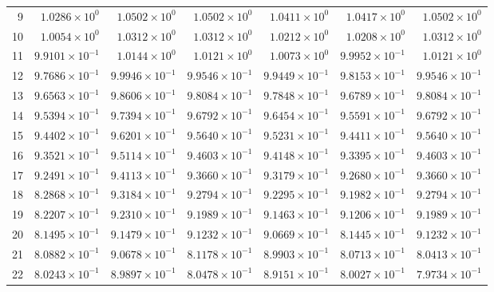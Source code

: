 \begin{table}[H]
\begin{tabular}{@{}rrrrrrr@{}}
9 & $1.0286\times10^{0}$ & $1.0502\times10^{0}$ & $1.0502\times10^{0}$ & $1.0411\times10^{0}$ & $1.0417\times10^{0}$ & $1.0502\times10^{0}$\\
10 & $1.0054\times10^{0}$ & $1.0312\times10^{0}$ & $1.0312\times10^{0}$ & $1.0212\times10^{0}$ & $1.0208\times10^{0}$ & $1.0312\times10^{0}$\\
11 & $9.9101\times10^{-1}$ & $1.0144\times10^{0}$ & $1.0121\times10^{0}$ & $1.0073\times10^{0}$ & $9.9952\times10^{-1}$ & $1.0121\times10^{0}$\\
12 & $9.7686\times10^{-1}$ & $9.9946\times10^{-1}$ & $9.9546\times10^{-1}$ & $9.9449\times10^{-1}$ & $9.8153\times10^{-1}$ & $9.9546\times10^{-1}$\\
13 & $9.6563\times10^{-1}$ & $9.8606\times10^{-1}$ & $9.8084\times10^{-1}$ & $9.7848\times10^{-1}$ & $9.6789\times10^{-1}$ & $9.8084\times10^{-1}$\\
14 & $9.5394\times10^{-1}$ & $9.7394\times10^{-1}$ & $9.6792\times10^{-1}$ & $9.6454\times10^{-1}$ & $9.5591\times10^{-1}$ & $9.6792\times10^{-1}$\\
15 & $9.4402\times10^{-1}$ & $9.6201\times10^{-1}$ & $9.5640\times10^{-1}$ & $9.5231\times10^{-1}$ & $9.4411\times10^{-1}$ & $9.5640\times10^{-1}$\\
16 & $9.3521\times10^{-1}$ & $9.5114\times10^{-1}$ & $9.4603\times10^{-1}$ & $9.4148\times10^{-1}$ & $9.3395\times10^{-1}$ & $9.4603\times10^{-1}$\\
17 & $9.2491\times10^{-1}$ & $9.4113\times10^{-1}$ & $9.3660\times10^{-1}$ & $9.3179\times10^{-1}$ & $9.2680\times10^{-1}$ & $9.3660\times10^{-1}$\\
18 & $8.2868\times10^{-1}$ & $9.3184\times10^{-1}$ & $9.2794\times10^{-1}$ & $9.2295\times10^{-1}$ & $9.1982\times10^{-1}$ & $9.2794\times10^{-1}$\\
19 & $8.2207\times10^{-1}$ & $9.2310\times10^{-1}$ & $9.1989\times10^{-1}$ & $9.1463\times10^{-1}$ & $9.1206\times10^{-1}$ & $9.1989\times10^{-1}$\\
20 & $8.1495\times10^{-1}$ & $9.1479\times10^{-1}$ & $9.1232\times10^{-1}$ & $9.0669\times10^{-1}$ & $8.1445\times10^{-1}$ & $9.1232\times10^{-1}$\\
21 & $8.0882\times10^{-1}$ & $9.0678\times10^{-1}$ & $8.1178\times10^{-1}$ & $8.9903\times10^{-1}$ & $8.0713\times10^{-1}$ & $8.0413\times10^{-1}$\\
22 & $8.0243\times10^{-1}$ & $8.9897\times10^{-1}$ & $8.0478\times10^{-1}$ & $8.9151\times10^{-1}$ & $8.0027\times10^{-1}$ & $7.9734\times10^{-1}$\\

\end{tabular}
\end{table}
